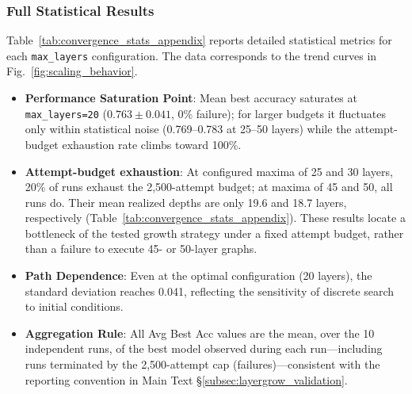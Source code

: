 \subsubsection{Full Statistical Results}
Table~\ref{tab:convergence_stats_appendix} reports detailed statistical metrics for each \texttt{max\_layers} configuration. The data corresponds to the trend curves in Fig.~\ref{fig:scaling_behavior}.

\begin{itemize}
    \item \textbf{Performance Saturation Point}: Mean best accuracy saturates at \texttt{max\_layers=20} ($0.763 \pm 0.041$, 0\% failure); for larger budgets it fluctuates only within statistical noise (0.769--0.783 at 25--50 layers) while the attempt-budget exhaustion rate climbs toward 100\%.
    \item \textbf{Attempt-budget exhaustion}: At configured maxima of 25 and 30 layers, 20\% of runs exhaust the 2,500-attempt budget; at maxima of 45 and 50, all runs do. Their mean realized depths are only 19.6 and 18.7 layers, respectively (Table~\ref{tab:convergence_stats_appendix}). These results locate a bottleneck of the tested growth strategy under a fixed attempt budget, rather than a failure to execute 45- or 50-layer graphs.
    \item \textbf{Path Dependence}: Even at the optimal configuration (20 layers), the standard deviation reaches 0.041, reflecting the sensitivity of discrete search to initial conditions. \item \textbf{Aggregation Rule}: All Avg Best Acc values are the mean, over the 10 independent runs, of the best model observed during each run---including runs terminated by the 2,500-attempt cap (failures)---consistent with the reporting convention in Main Text \S\ref{subsec:layergrow_validation}.
\end{itemize}

